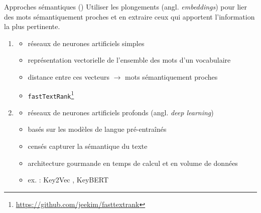 \begin{frame}{Approches sémantiques {\small(\hypersetup{citecolor=yellow}\cite{garaudsemantiques})}}
\justifying
Utiliser les \og{}plongements\fg{} (angl. \textit{embeddings}) pour lier des mots sémantiquement proches et en extraire ceux qui apportent l’information la plus pertinente.
\begin{enumerate}
\item \colorbox{yellow!40}{\color{red!50!black}{plongements de mots}}
\begin{itemize}
\item réseaux de neurones artificiels \og{}simples\fg{}
\item représentation vectorielle de l’ensemble des mots d’un vocabulaire
\item distance entre ces vecteurs $\rightarrow$ mots sémantiquement proches
\item \texttt{fastTextRank}\footnote{\url{https://github.com/jeekim/fasttextrank}}
\end{itemize}
\item \colorbox{yellow!40}{}
\begin{itemize}
\item réseaux de neurones artificiels \og{}profonds\fg{} (angl. \textit{deep learning})
\item basés sur les modèles de langue pré-entraînés
\item censés capturer la sémantique du texte
\item architecture gourmande en temps de calcul et en volume de données
\item ex. : Key2Vec \citep{mahata2018key2vec}, Key\textsc{BERT} \small{\citep{grootendorst2020keybert}}
\end{itemize}
\end{enumerate}
\end{frame}

